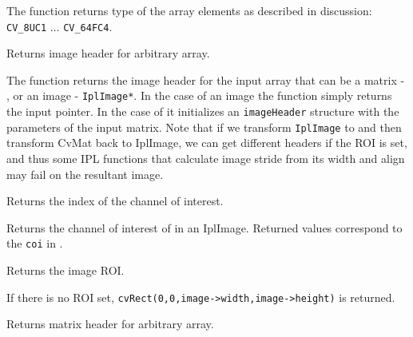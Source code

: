 The function returns type of the array elements
as described in  discussion: \texttt{CV\_8UC1} ... \texttt{CV\_64FC4}.


Returns image header for arbitrary array.


\begin{description}
\ifC
{}
\fi
\end{description}

The function returns the image header for the input array
that can be a matrix - , or an image - \texttt{IplImage*}. In
the case of an image the function simply returns the input pointer. In the
case of  it initializes an \texttt{imageHeader} structure
with the parameters of the input matrix. Note that if we transform
\texttt{IplImage} to  and then transform CvMat back to
IplImage, we can get different headers if the ROI is set, and thus some
IPL functions that calculate image stride from its width and align may
fail on the resultant image.

Returns the index of the channel of interest. 


\begin{description}
\end{description}

Returns the channel of interest of in an IplImage. Returned values correspond to the \texttt{coi} in .

Returns the image ROI.


\begin{description}
\end{description}

If there is no ROI set, \texttt{cvRect(0,0,image->width,image->height)} is returned.

Returns matrix header for arbitrary array.

